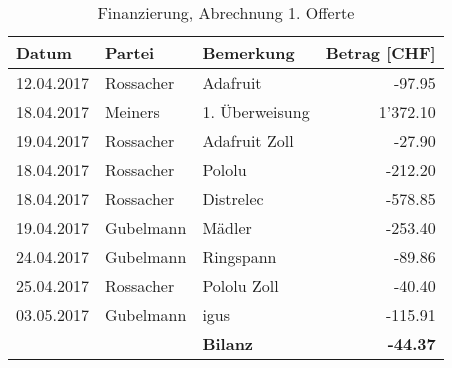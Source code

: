 \begin{table}[H]
	\small
	\centering
	\caption{Finanzierung, Abrechnung 1. Offerte}
	\begin{tabular}{lrlr}
		\hline
		\multicolumn{1}{|l|}{\textbf{Datum}} & \multicolumn{1}{l|}{\textbf{Partei}} & \multicolumn{1}{l|}{\textbf{Bemerkung}} & \multicolumn{1}{l|}{\textbf{Betrag [CHF]}} \\
		\hline
		\multicolumn{1}{|l|}{12.04.2017} & \multicolumn{1}{l|}{Rossacher} & \multicolumn{1}{l|}{Adafruit} & \multicolumn{1}{r|}{-97.95} \\
		\hline
		\multicolumn{1}{|l|}{18.04.2017} & \multicolumn{1}{l|}{Meiners} & \multicolumn{1}{l|}{1. Überweisung} & \multicolumn{1}{r|}{1'372.10} \\
		\hline
		\multicolumn{1}{|l|}{19.04.2017} & \multicolumn{1}{l|}{Rossacher} & \multicolumn{1}{l|}{Adafruit Zoll} & \multicolumn{1}{r|}{-27.90} \\
		\hline
		\multicolumn{1}{|l|}{18.04.2017} & \multicolumn{1}{l|}{Rossacher} & \multicolumn{1}{l|}{Pololu} & \multicolumn{1}{r|}{-212.20} \\
		\hline
		\multicolumn{1}{|l|}{18.04.2017} & \multicolumn{1}{l|}{Rossacher} & \multicolumn{1}{l|}{Distrelec} & \multicolumn{1}{r|}{-578.85} \\
		\hline
		\multicolumn{1}{|l|}{19.04.2017} & \multicolumn{1}{l|}{Gubelmann} & \multicolumn{1}{l|}{Mädler} & \multicolumn{1}{r|}{-253.40} \\
		\hline
		\multicolumn{1}{|l|}{24.04.2017} & \multicolumn{1}{l|}{Gubelmann} & \multicolumn{1}{l|}{Ringspann} & \multicolumn{1}{r|}{-89.86} \\
		\hline
		\multicolumn{1}{|l|}{25.04.2017} & \multicolumn{1}{l|}{Rossacher} & \multicolumn{1}{l|}{Pololu Zoll} & \multicolumn{1}{r|}{-40.40} \\
		\hline
		\multicolumn{1}{|l|}{03.05.2017} & \multicolumn{1}{l|}{Gubelmann} & \multicolumn{1}{l|}{igus} & \multicolumn{1}{r|}{-115.91} \\
		\hline
		&       & \textbf{Bilanz} & \textbf{-44.37} \\
	\end{tabular}%
	\label{tab:Finanzierung_Offerte1}%
\end{table}%


